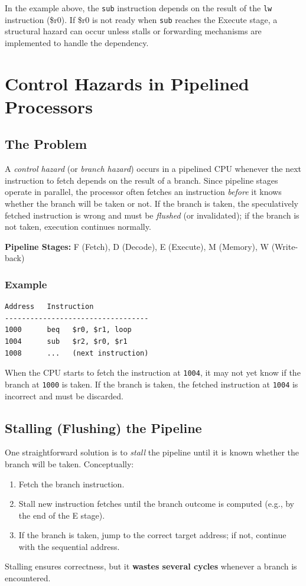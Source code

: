 In the example above, the \texttt{sub} instruction depends on the result of the \texttt{lw} instruction (\$r0). If \$r0 is not ready when \texttt{sub} reaches the Execute stage, a structural hazard can occur unless stalls or forwarding mechanisms are implemented to handle the dependency.
\newpage
\section{Control Hazards in Pipelined Processors}

\subsection{The Problem}
A \emph{control hazard} (or \emph{branch hazard}) occurs in a pipelined CPU whenever the next instruction to fetch depends on the result of a branch. Since pipeline stages operate in parallel, the processor often fetches an instruction \emph{before} it knows whether the branch will be taken or not. If the branch is taken, the speculatively fetched instruction is wrong and must be \emph{flushed} (or invalidated); if the branch is not taken, execution continues normally.

\begin{center}
\textbf{Pipeline Stages:} F (Fetch), D (Decode), E (Execute), M (Memory), W (Write-back)
\end{center}

\subsubsection{Example}
\begin{verbatim}
Address   Instruction
----------------------------------
1000      beq   $r0, $r1, loop
1004      sub   $r2, $r0, $r1
1008      ...   (next instruction)
\end{verbatim}

When the CPU starts to fetch the instruction at \texttt{1004}, it may not yet know if the branch at \texttt{1000} is taken. If the branch is taken, the fetched instruction at \texttt{1004} is incorrect and must be discarded.

\subsection{Stalling (Flushing) the Pipeline}
One straightforward solution is to \emph{stall} the pipeline until it is known whether the branch will be taken. Conceptually:
\begin{enumerate}
  \item Fetch the branch instruction.
  \item Stall new instruction fetches until the branch outcome is computed (e.g., by the end of the E stage).
  \item If the branch is taken, jump to the correct target address; if not, continue with the sequential address.
\end{enumerate}
Stalling ensures correctness, but it \textbf{wastes several cycles} whenever a branch is encountered.

